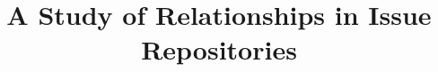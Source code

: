 \documentclass[conference]{sig-alternate}
\begin{document}
%
\title{A Study of Relationships in Issue Repositories}

%


%
\end{document}
